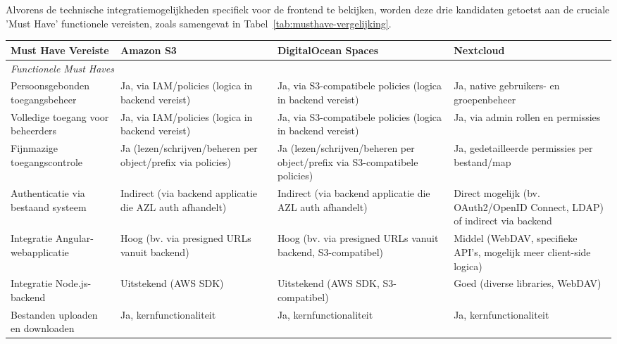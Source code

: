 Alvorens de technische integratiemogelijkheden specifiek voor de frontend te bekijken, worden deze drie kandidaten getoetst aan de cruciale 'Must Have' functionele vereisten, zoals samengevat in Tabel~\ref{tab:musthave-vergelijking}.


\begin{table}[H]
    \centering
    \scriptsize %
    \setlength{\tabcolsep}{4pt} %
    \renewcommand{\arraystretch}{0.9} %
    \begin{tabularx}{\textwidth}{l >{\raggedright\arraybackslash}X >{\raggedright\arraybackslash}X >{\raggedright\arraybackslash}X}
      \toprule
      \textbf{Must Have Vereiste} & \textbf{Amazon S3} & \textbf{DigitalOcean Spaces} & \textbf{Nextcloud} \\
      \midrule
      \multicolumn{4}{l}{\textit{Functionele Must Haves}} \\
      Persoonsgebonden toegangsbeheer & Ja, via IAM/policies (logica in backend vereist) & Ja, via S3-compatibele policies (logica in backend vereist) & Ja, native gebruikers- en groepenbeheer \\
      \midrule
      Volledige toegang voor beheerders & Ja, via IAM/policies (logica in backend vereist) & Ja, via S3-compatibele policies (logica in backend vereist) & Ja, via admin rollen en permissies \\
      \midrule
      Fijnmazige toegangscontrole & Ja (lezen/schrijven/beheren per object/prefix via policies) & Ja (lezen/schrijven/beheren per object/prefix via S3-compatibele policies) & Ja, gedetailleerde permissies per bestand/map \\
      \midrule
      Authenticatie via bestaand systeem & Indirect (via backend applicatie die AZL auth afhandelt) & Indirect (via backend applicatie die AZL auth afhandelt) & Direct mogelijk (bv. OAuth2/OpenID Connect, LDAP) of indirect via backend \\
      \midrule
      Integratie Angular-webapplicatie & Hoog (bv. via presigned URLs vanuit backend) & Hoog (bv. via presigned URLs vanuit backend, S3-compatibel) & Middel (WebDAV, specifieke API's, mogelijk meer client-side logica) \\
      \midrule
      Integratie Node.js-backend & Uitstekend (AWS SDK) & Uitstekend (AWS SDK, S3-compatibel) & Goed (diverse libraries, WebDAV) \\
      \midrule
      Bestanden uploaden en downloaden & Ja, kernfunctionaliteit & Ja, kernfunctionaliteit & Ja, kernfunctionaliteit \\

\end{tabularx}
\end{table}
